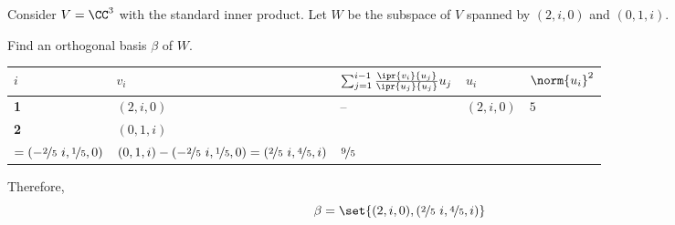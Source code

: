 \documentclass[11pt]{scrartcl}
\begin{document}
  Consider $V=\CC^3$ with the standard inner product. Let $W$ be the
  subspace of $V$ spanned by $(2, i, 0)$ and $(0, 1, i)$.
\begin{problem*}
  Find an orthogonal basis $\beta$ of $W$.
\end{problem*}
\begin{soln}
  \hfill
    \begin{center}
    \renewcommand{\arraystretch}{1.5}
    \begin{tabular}{>{\centering\bfseries}m{0.1in}| >{\centering}m{0.5in}| >{\centering}m{1in}| >{\centering}m{1in}|  >{\centering\arraybackslash}m{1in}}%
      \hline
      $i$                                                                                         & $v_i$       & $\sum_{j=1}^{i-1} \frac{ \ipr{v_i}{u_j}}{\ipr{u_j}{u_j}}u_j$ & $u_i$        & $\norm{u_i}^2$ \\
      \hline
      1                                                                                           & $(2, i, 0)$ & --                                                           & $ (2, i, 0)$ & $5$            \\
      \hline
      2                                                                                           & $(0, 1, i)$ & \shortstack[l]{ $\frac{2\*0+(-i)\*1+0\*i }{5}u_1 $                                           \\$=(-\nicefrac{2}{5}\ 
      i, \nicefrac{1}{5}
      , 0)$ }
                                                                                                  & $(0, 1, i)-(-\nicefrac{2}{5}
                                                                                                    \ i, \nicefrac{1}{5}
                                                                                                    , 0) = (\nicefrac{2}{5}
                                                                                                    \ i, \nicefrac{4}{5}
                                                                                                    , i)$ & $\nicefrac{9}{5}
                                                                                                            $ \\
      \hline
    \end{tabular}
  \end{center}
    
  Therefore,
  \begin{equation*}
    \beta = \set{(2,i, 0),(\nicefrac{2}{5}\ i,\nicefrac{4}{5}, i)}
  \end{equation*}
\end{soln}
\end{document}
